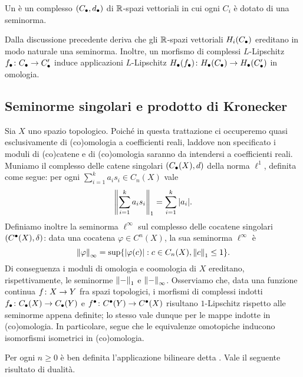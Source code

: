 \begin{definition}
Un  è un complesso $(C_\bullet,d_\bullet)$ di $\mathbb{R}$-spazi vettoriali in cui ogni $C_i$ è dotato di una seminorma.
\end{definition}

Dalla discussione precedente deriva che gli $\mathbb{R}$-spazi vettoriali $H_i(C_\bullet)$ ereditano in modo naturale una seminorma. Inoltre, un morfismo di complessi $L$-Lipschitz $\map{f_\bul}{C_\bul}{C'_\bul}$ induce applicazioni $L$-Lipschitz $\map{H_\bul(f_\bul)}{H_\bul(C_\bul)}{H_\bul(C'_\bul)}$ in omologia.

\subsection{Seminorme singolari e prodotto di Kronecker}

Sia $X$ uno spazio topologico. Poiché in questa trattazione ci occuperemo quasi esclusivamente di (co)omologia a coefficienti reali, laddove non specificato i moduli di (co)catene e di (co)omologia saranno da intendersi a coefficienti reali. Muniamo il complesso delle catene singolari $(C_\bullet(X),d)$ della norma $\ell^1$, definita come segue: per ogni $\sum_{i=1}^ka_is_i\in C_n(X)$ vale
\[
\left\lVert \sum_{i=1}^ka_is_i\right\rVert_1=\sum_{i=1}^k|a_i|.
\]
Definiamo inoltre la seminorma $\ell^\infty$ sul complesso delle cocatene singolari $(C^\bullet(X),\delta)$: data una cocatena $\varphi\in C^n(X)$, la sua seminorma $\ell^\infty$ è
\[
\left\lVert \varphi\right\rVert_\infty=\sup\{|\varphi(c)|:c\in C_n(X),\left\lVert c\right\rVert_1\le 1\}.
\]
Di conseguenza i moduli di omologia e coomologia di $X$ ereditano, rispettivamente, le seminorme $\left\lVert -\right\rVert_1$ e $\left\lVert -\right\rVert_\infty$. Osserviamo che, data una funzione continua $\map{f}{X}{Y}$ fra spazi topologici, i morfismi di complessi indotti $\map{f_\bul}{C_\bul(X)}{C_\bul(Y)}$ e $\map{f^\bul}{C^\bul(Y)}{C^\bul(X)}$ risultano $1$-Lipschitz rispetto alle seminorme appena definite; lo stesso vale dunque per le mappe indotte in (co)omologia. In particolare, segue che le equivalenze omotopiche inducono isomorfismi isometrici in (co)omologia.

Per ogni $n\ge 0$ è ben definita l'applicazione bilineare
detta . Vale il seguente risultato di dualità.

